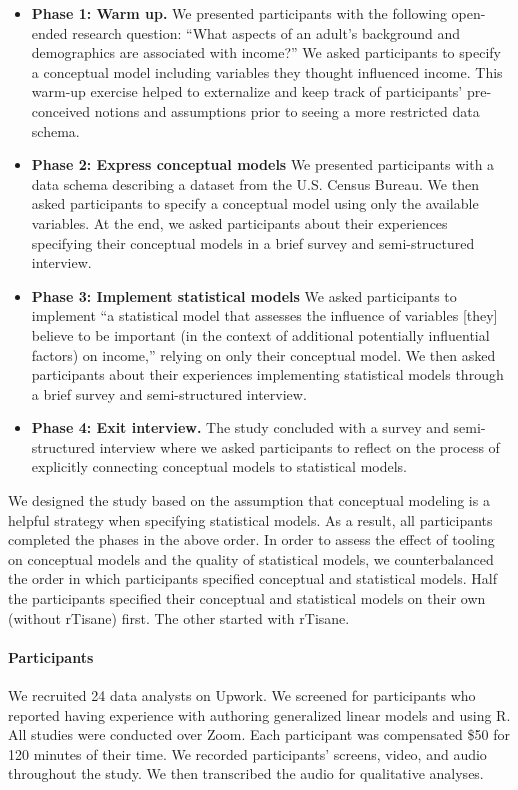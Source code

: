 \begin{itemize}
    \item \textbf{Phase 1: Warm up.} We presented participants with the
    following open-ended research question: ``What aspects of an adult's
    background and demographics are associated with income?'' We asked
    participants to specify a conceptual model including variables they thought
    influenced income. This warm-up exercise helped to externalize and keep
    track of participants' pre-conceived notions and assumptions prior to seeing
    a more restricted data schema.
    \item \textbf{Phase 2: Express conceptual models} We presented participants
    with a data schema describing a dataset from the U.S. Census Bureau. We then
    asked participants to specify a conceptual model using only the available
    variables. At the end, we asked participants about their
    experiences specifying their conceptual models in a brief survey and semi-structured interview.
    \item \textbf{Phase 3: Implement statistical models} We asked participants
    to implement ``a statistical model that assesses the influence of variables
    [they] believe to be important (in the context of additional potentially
    influential factors) on income,'' relying on only their conceptual model. We
    then asked participants about their experiences implementing statistical
    models through a brief survey and semi-structured interview. 
    \item \textbf{Phase 4: Exit interview.} The study concluded with a survey
    and semi-structured interview where we asked participants to reflect on the
    process of explicitly connecting conceptual models to statistical models.
\end{itemize} 

We designed the study based on the assumption that conceptual modeling is a
helpful strategy when specifying statistical models. As a result, all
participants completed the phases in the above order. In order to assess the
effect of tooling on conceptual models and the quality of statistical models, we
counterbalanced the order in which participants specified conceptual and
statistical models. Half the participants specified their conceptual and
statistical models on their own (without rTisane) first. The other started with
rTisane.

\noindent \paragraph{Participants} We recruited 24 data analysts on Upwork. We
screened for participants who reported having experience with authoring
generalized linear models and using R.  All studies were conducted over Zoom. Each participant was
compensated \$50 for 120 minutes of their time. We recorded participants'
screens, video, and audio throughout the study. We then transcribed the audio
for qualitative analyses.

